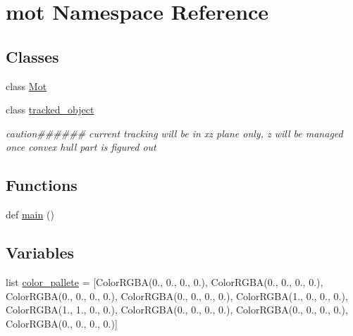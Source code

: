 \hypertarget{namespacemot}{}\section{mot Namespace Reference}
\label{namespacemot}
\subsection*{Classes}
\begin{DoxyCompactItemize}
\item 
class \hyperlink{classmot_1_1Mot}{Mot}
\item 
class \hyperlink{classmot_1_1tracked__object}{tracked\+\_\+object}
\begin{DoxyCompactList}\small\item\em caution\#\#\#\#\#\# current tracking will be in xz plane only, z will be managed once convex hull part is figured out \end{DoxyCompactList}\end{DoxyCompactItemize}
\subsection*{Functions}
\begin{DoxyCompactItemize}
\item 
def \hyperlink{namespacemot_a0aeef71e241eafce8fb5d73cfe5ef0e7}{main} ()
\end{DoxyCompactItemize}
\subsection*{Variables}
\begin{DoxyCompactItemize}
\item 
list \hyperlink{namespacemot_a175bf1670619de28a5c8277715c2aee5}{color\+\_\+pallete} = \mbox{[}Color\+R\+G\+BA(0., 0., 0., 0.), Color\+R\+G\+BA(0., 0., 0., 0.), Color\+R\+G\+BA(0., 0., 0., 0.), Color\+R\+G\+BA(0., 0., 0., 0.), Color\+R\+G\+BA(1., 0., 0., 0.), Color\+R\+G\+BA(1., 1., 0., 0.), Color\+R\+G\+BA(0., 0., 0., 0.), Color\+R\+G\+BA(0., 0., 0., 0.), Color\+R\+G\+BA(0., 0., 0., 0.)\mbox{]}
\end{DoxyCompactItemize}


